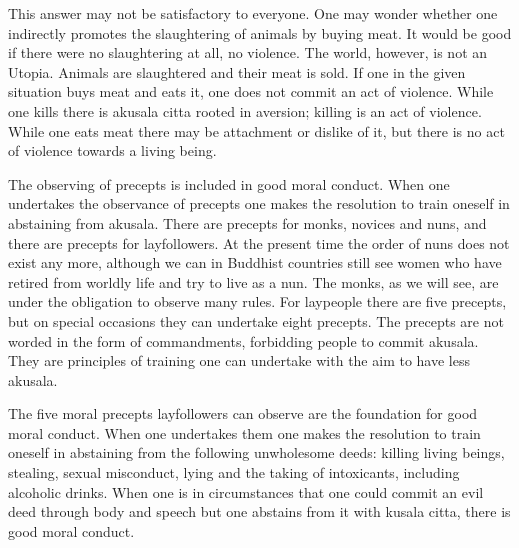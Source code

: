 \documentclass{book}
\begin{document}
This answer may not be satisfactory to everyone. One may wonder whether
one indirectly promotes the slaughtering of animals by buying meat. It
would be good if there were no slaughtering at all, no violence. The
world, however, is not an Utopia. Animals are slaughtered and their meat
is sold. If one in the given situation buys meat and eats it, one does
not commit an act of violence. While one kills there is akusala citta
rooted in aversion; killing is an act of violence. While one eats meat
there may be attachment or dislike of it, but there is no act of
violence towards a living being.

The observing of precepts is included in good moral conduct. When one
undertakes the observance of precepts one makes the resolution to train
oneself in abstaining from akusala. There are precepts for monks,
novices and nuns, and there are precepts for layfollowers. At the
present time the order of nuns does not exist any more, although we can
in Buddhist countries still see women who have retired from worldly life
and try to live as a nun. The monks, as we will see, are under the
obligation to observe many rules. For laypeople there are five precepts,
but on special occasions they can undertake eight precepts. The precepts
are not worded in the form of commandments, forbidding people to commit
akusala. They are principles of training one can undertake with the aim
to have less akusala.

The five moral precepts layfollowers can observe are the foundation for
good moral conduct. When one undertakes them one makes the resolution to
train oneself in abstaining from the following unwholesome deeds:
killing living beings, stealing, sexual misconduct, lying and the taking
of intoxicants, including alcoholic drinks. When one is in circumstances
that one could commit an evil deed through body and speech but one
abstains from it with kusala citta, there is good moral conduct.
\end{document}
